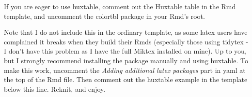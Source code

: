 \documentclass[12pt,preprint, authoryear]{elsarticle}
\numberwithin{equation}{section}
\numberwithin{figure}{section}
\numberwithin{table}{section}
\begin{document}
If you are eager to use huxtable, comment out the Huxtable table in the
Rmd template, and uncomment the colortbl package in your Rmd's root.

Note that I do not include this in the ordinary template, as some latex
users have complained it breaks when they build their Rmds (especially
those using tidytex - I don't have this problem as I have the full
Miktex installed on mine). Up to you, but I strongly recommend
installing the package manually and using huxtable. To make this work,
uncomment the \emph{Adding additional latex packages} part in yaml at
the top of the Rmd file. Then comment out the huxtable example in the
template below this line. Reknit, and enjoy.

 
  \providecommand{\huxb}[2]{\arrayrulecolor[RGB]{#1}\global\arrayrulewidth=#2pt}
  \providecommand{\huxvb}[2]{\color[RGB]{#1}\vrule width #2pt}
  \providecommand{\huxtpad}[1]{\rule{0pt}{#1}}
  \providecommand{\huxbpad}[1]{\rule[-#1]{0pt}{#1}}
\end{document}
